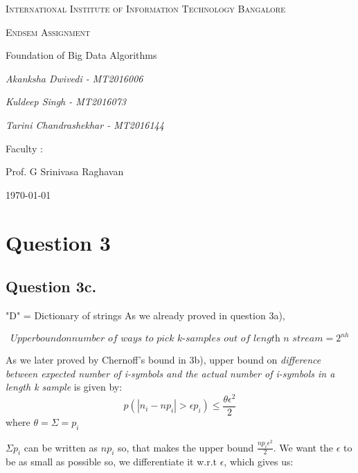 \documentclass[12pt,a4paper]{article}
\begin{document}
\begin{titlepage}
	\centering
	{\scshape\LARGE International Institute of Information Technology Bangalore \par}
	\vspace{1cm}
	{\scshape\Large Endsem Assignment\par}
	{\Large Foundation of Big Data Algorithms\par}
	\vspace{1.5cm}
	{\Large\itshape Akanksha Dwivedi - MT2016006\par}
	{\Large\itshape Kuldeep Singh - MT2016073\par}
	{\Large\itshape Tarini Chandrashekhar - MT2016144\par}
	\vfill
	
	Faculty : \par
	Prof. G Srinivasa Raghavan

	\vfill

	{\large \today\par}
\end{titlepage}


\tableofcontents
\newpage
\section{Question 3}
\subsection{Question 3c.}

"D" = Dictionary of strings
As we already proved in question 3a),

\begin{equation*}
    Upper bound on \textit{number of ways to pick k-samples out of length n stream} = 2^{nh}
\end{equation*}

As we later proved by Chernoff's bound in 3b), upper bound on \textit{difference between expected number of i-symbols and the actual number of i-symbols in a length k sample } is given by:
\begin{equation*}
    p(|n_i-np_i| > \epsilon p_i) \leq \frac{\theta\epsilon^2}{2}
\end{equation*}
where $\theta = \Sigma = p_i$

$\Sigma p_i$ can be written as $np_i$ so, that makes the upper bound $\frac{np_i\epsilon^2}{2}$. We want the $\epsilon$ to be as small as possible so, we differentiate it w.r.t $\epsilon$, which gives us:
\end{document}
